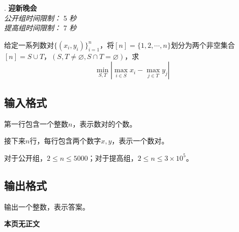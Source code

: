 \addtocounter{ProblemNo}{1}
\renewcommand{\ProblemName}{迎新晚会}
\begin{center}
\huge{. \textbf{\ProblemName}} \\ [0.8cm]
\large{\textit{公开组时间限制：} 5 \textit{秒}} \\ 
\large{\textit{提高组时间限制：} 7 \textit{秒}} \\ [1cm]
\end{center}

给定一系列数对$\{(x_i, y_i)\}_{i=1}^{n}$，将$[n] = \{1, 2, \cdots, n\}$划分为两个非空集合$[n] = S \cup T$，$(S, T \neq \varnothing, S \cap T = \varnothing)$，求
$$
\min_{S, T} | \max_{i \in S} x_i - \max_{j \in T} y_j |
$$

\subsection*{输入格式}

第一行包含一个整数$n$，表示数对的个数。

接下来$n$行，每行包含两个数字$x, y$，表示一个数对。

对于公开组，$2 \leq n \leq 5000$；对于提高组，$2 \leq n \leq 3 \times 10^5$。

\subsection*{输出格式}

输出一个整数，表示答案。

\setcounter{ExampleNo}{0}


\clearpage

\ifodd\value{page}
\else
    \vspace*{\fill}
    \begin{center}
    \textbf{\Large 本页无正文}
    \end{center}
    \vspace*{\fill}
    \clearpage
\fi

